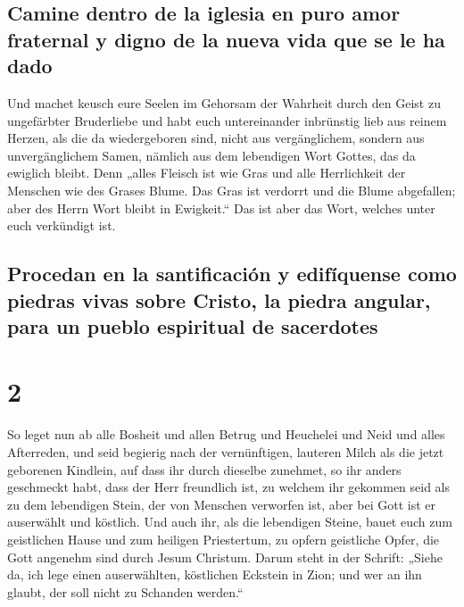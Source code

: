 \hypertarget{camine-dentro-de-la-iglesia-en-puro-amor-fraternal-y-digno-de-la-nueva-vida-que-se-le-ha-dado}{%
\subsection{Camine dentro de la iglesia en puro amor fraternal y digno
de la nueva vida que se le ha
dado}\label{camine-dentro-de-la-iglesia-en-puro-amor-fraternal-y-digno-de-la-nueva-vida-que-se-le-ha-dado}}

 Und machet keusch eure Seelen im Gehorsam der Wahrheit
durch den Geist zu ungefärbter Bruderliebe und habt euch untereinander
inbrünstig lieb aus reinem Herzen,  als die da
wiedergeboren sind, nicht aus vergänglichem, sondern aus unvergänglichem
Samen, nämlich aus dem lebendigen Wort Gottes, das da ewiglich bleibt.
 Denn „alles Fleisch ist wie Gras und alle Herrlichkeit
der Menschen wie des Grases Blume. Das Gras ist verdorrt und die Blume
abgefallen;  aber des Herrn Wort bleibt in Ewigkeit.``
Das ist aber das Wort, welches unter euch verkündigt ist.

\hypertarget{procedan-en-la-santificaciuxf3n-y-edifuxedquense-como-piedras-vivas-sobre-cristo-la-piedra-angular-para-un-pueblo-espiritual-de-sacerdotes}{%
\subsection{Procedan en la santificación y edifíquense como piedras
vivas sobre Cristo, la piedra angular, para un pueblo espiritual de
sacerdotes}\label{procedan-en-la-santificaciuxf3n-y-edifuxedquense-como-piedras-vivas-sobre-cristo-la-piedra-angular-para-un-pueblo-espiritual-de-sacerdotes}}

\hypertarget{section-1}{%
\section{2}\label{section-1}}

 So leget nun ab alle Bosheit und allen Betrug und
Heuchelei und Neid und alles Afterreden,  und seid
begierig nach der vernünftigen, lauteren Milch als die jetzt geborenen
Kindlein, auf dass ihr durch dieselbe zunehmet,  so ihr
anders geschmeckt habt, dass der Herr freundlich ist,  zu
welchem ihr gekommen seid als zu dem lebendigen Stein, der von Menschen
verworfen ist, aber bei Gott ist er auserwählt und köstlich.
 Und auch ihr, als die lebendigen Steine, bauet euch zum
geistlichen Hause und zum heiligen Priestertum, zu opfern geistliche
Opfer, die Gott angenehm sind durch Jesum Christum.  Darum
steht in der Schrift: „Siehe da, ich lege einen auserwählten, köstlichen
Eckstein in Zion; und wer an ihn glaubt, der soll nicht zu Schanden
werden.``

